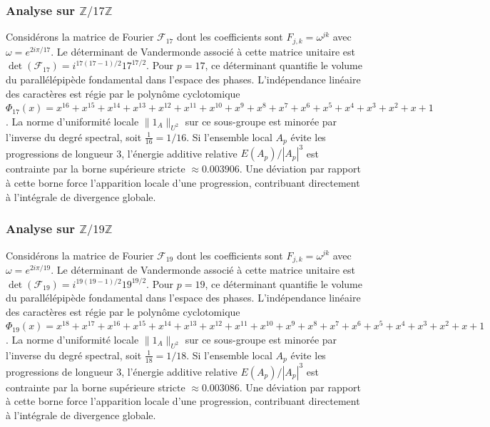 \documentclass[11pt,a4paper]{article}
\begin{document}
\subsubsection{Analyse sur $\mathbb{Z}/17\mathbb{Z}$}
Considérons la matrice de Fourier $\mathcal{F}_{17}$ dont les coefficients sont $F_{j, k} = \omega^{j k}$ avec $\omega = e^{2i\pi/17}$. Le déterminant de Vandermonde associé à cette matrice unitaire est $\det(\mathcal{F}_{17}) = i^{17(17-1)/2} 17^{17/2}$. Pour $p = 17$, ce déterminant quantifie le volume du parallélépipède fondamental dans l'espace des phases. L'indépendance linéaire des caractères est régie par le polynôme cyclotomique $\Phi_{17}(x) = x^{16} + x^{15} + x^{14} + x^{13} + x^{12} + x^{11} + x^{10} + x^{9} + x^{8} + x^{7} + x^{6} + x^{5} + x^{4} + x^{3} + x^{2} + x + 1$. La norme d'uniformité locale $\|1_A\|_{U^2}$ sur ce sous-groupe est minorée par l'inverse du degré spectral, soit $\frac{1}{16} = 1/16$. Si l'ensemble local $A_p$ évite les progressions de longueur 3, l'énergie additive relative $E(A_p) / |A_p|^3$ est contrainte par la borne supérieure stricte $\approx 0.003906$. Une déviation par rapport à cette borne force l'apparition locale d'une progression, contribuant directement à l'intégrale de divergence globale.
\subsubsection{Analyse sur $\mathbb{Z}/19\mathbb{Z}$}
Considérons la matrice de Fourier $\mathcal{F}_{19}$ dont les coefficients sont $F_{j, k} = \omega^{j k}$ avec $\omega = e^{2i\pi/19}$. Le déterminant de Vandermonde associé à cette matrice unitaire est $\det(\mathcal{F}_{19}) = i^{19(19-1)/2} 19^{19/2}$. Pour $p = 19$, ce déterminant quantifie le volume du parallélépipède fondamental dans l'espace des phases. L'indépendance linéaire des caractères est régie par le polynôme cyclotomique $\Phi_{19}(x) = x^{18} + x^{17} + x^{16} + x^{15} + x^{14} + x^{13} + x^{12} + x^{11} + x^{10} + x^{9} + x^{8} + x^{7} + x^{6} + x^{5} + x^{4} + x^{3} + x^{2} + x + 1$. La norme d'uniformité locale $\|1_A\|_{U^2}$ sur ce sous-groupe est minorée par l'inverse du degré spectral, soit $\frac{1}{18} = 1/18$. Si l'ensemble local $A_p$ évite les progressions de longueur 3, l'énergie additive relative $E(A_p) / |A_p|^3$ est contrainte par la borne supérieure stricte $\approx 0.003086$. Une déviation par rapport à cette borne force l'apparition locale d'une progression, contribuant directement à l'intégrale de divergence globale.
\end{document}
